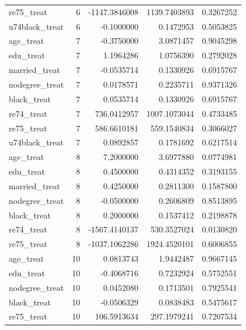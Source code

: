 \documentclass[
]{article}
\begin{document}
\begin{enumerate}
\begin{longtable}[]{@{}lrrrr@{}}
  re75\_treat & 6 & -1147.3846008 & 1139.7403893 & 0.3267252 \\
  u74black\_treat & 6 & -0.1000000 & 0.1472953 & 0.5053825 \\
  age\_treat & 7 & -0.3750000 & 3.0871457 & 0.9045298 \\
  edu\_treat & 7 & 1.1964286 & 1.0756390 & 0.2792028 \\
  married\_treat & 7 & -0.0535714 & 0.1330926 & 0.6915767 \\
  nodegree\_treat & 7 & 0.0178571 & 0.2235711 & 0.9371326 \\
  black\_treat & 7 & 0.0535714 & 0.1330926 & 0.6915767 \\
  re74\_treat & 7 & 736.0412957 & 1007.1073044 & 0.4733485 \\
  re75\_treat & 7 & 586.6610181 & 559.1540834 & 0.3066027 \\
  u74black\_treat & 7 & 0.0892857 & 0.1781692 & 0.6217514 \\
  age\_treat & 8 & 7.2000000 & 3.6977880 & 0.0774981 \\
  edu\_treat & 8 & 0.4500000 & 0.4314352 & 0.3193155 \\
  married\_treat & 8 & 0.4250000 & 0.2811300 & 0.1587800 \\
  nodegree\_treat & 8 & -0.0500000 & 0.2606809 & 0.8513895 \\
  black\_treat & 8 & 0.2000000 & 0.1537412 & 0.2198878 \\
  re74\_treat & 8 & -1567.4140137 & 530.3527024 & 0.0130820 \\
  re75\_treat & 8 & -1037.1062286 & 1924.4520101 & 0.6006855 \\
  age\_treat & 10 & 0.0813743 & 1.9442487 & 0.9667145 \\
  edu\_treat & 10 & -0.4068716 & 0.7232924 & 0.5752551 \\
  nodegree\_treat & 10 & 0.0452080 & 0.1713501 & 0.7925541 \\
  black\_treat & 10 & -0.0506329 & 0.0838483 & 0.5475617 \\
  re75\_treat & 10 & 106.5913634 & 297.1979241 & 0.7207534 \\
  \end{longtable}
\end{enumerate}
\end{document}
